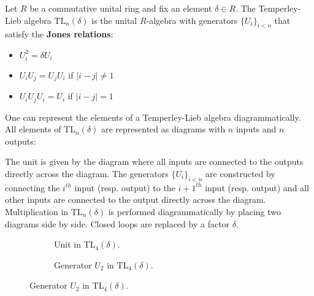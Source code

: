         \begin{example}
        	Let $R$ be a commutative unital ring and fix an element $\delta\in R$. The Temperley-Lieb algebra TL$_n(\delta)$ is the unital $R$-algebra with generators $\{U_i\}_{i<n}$ that satisfy the \textbf{Jones relations}:
        	\begin{itemize}
        		\item $U_i^2 = \delta U_i$
        		\item $U_i U_j = U_j U_i$ if $|i-j|\neq 1$
        		\item $U_i U_j U_i = U_i$ if $|i-j| = 1$
        	\end{itemize}
        	One can represent the elements of a Temperley-Lieb algebra diagrammatically. All elements of TL$_n(\delta)$ are represented as diagrams with $n$ inputs and $n$ outputs:

        	\hspace{1cm} The unit is given by the diagram where all inputs are connected to the outputs directly across the diagram. The generators $\{U_i\}_{i<n}$ are constructed by connecting the $i^{th}$ input (resp. output) to the $i+1^{th}$ input (resp. output) and all other inputs are connected to the output directly across the diagram.
        	Multiplication in TL$_n(\delta)$ is performed diagrammatically by placing two diagrams side by side. Closed loops are replaced by a factor $\delta$.

        	\hspace{5pt}
        	\begin{figure}[ht!]
        		\centering
        		\begin{subfigure}{0.49\textwidth}
        			\centering
				\caption{Unit in TL$_4(\delta)$.}
				\label{fig:unit_temperley_lieb}
			\end{subfigure}
			\begin{subfigure}{0.49\textwidth}
				\centering
				\caption{Generator $U_2$ in TL$_4(\delta)$.}
				\label{fig:generator_temperley_lieb}
			\end{subfigure}
        	\end{figure}
        \end{example}
        
